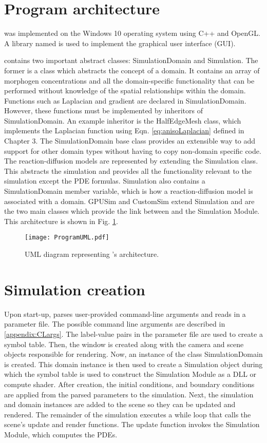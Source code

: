 \section{Program architecture} 
\ProgramName{} was implemented on the Windows 10 operating system using C++ and OpenGL. A library named  \citep{cornut2019} is used to implement the graphical user interface (GUI). 

\ProgramName{} contains two important abstract classes: SimulationDomain and Simulation. The former is a class which abstracts the concept of a domain. It contains an array of morphogen concentrations and all the domain-specific functionality that can be performed without knowledge of the spatial relationships within the domain. Functions such as Laplacian and gradient are declared in SimulationDomain. However, these functions must be implemented by inheritors of SimulationDomain. An example inheritor is the HalfEdgeMesh class, which implements the Laplacian function using Eqn. \ref{eq:anisoLaplacian} defined in Chapter 3. The SimulationDomain base class provides an extensible way to add support for other domain types without having to copy non-domain specific code. The reaction-diffusion models are represented by extending the Simulation class. This abstracts the simulation and provides all the functionality relevant to the simulation except the PDE formulas. Simulation also contains a SimulationDomain member variable, which is how a reaction-diffusion model is associated with a domain. GPUSim and CustomSim extend Simulation and are the two main classes which provide the link between \ProgramName{} and the Simulation Module. This architecture is shown in Fig. \ref{fig:umlDiagram}.

\begin{figure}[H]
	\centering
	\texttt{[image: ProgramUML.pdf]}
	\caption{UML diagram representing \ProgramName{}'s architecture.}
	\label{fig:umlDiagram}
\end{figure}

\section{Simulation creation}
Upon start-up, \ProgramName{} parses user-provided command-line arguments and reads in a parameter file. The possible command line arguments are described in \ref{appendix:CLargs}. The label-value pairs in the parameter file are used to create a symbol table. Then, the window is created along with the camera and scene objects responsible for rendering. Now, an instance of the class SimulationDomain is created. This domain instance is then used to create a Simulation object during which the symbol table is used to construct the Simulation Module as a DLL or compute shader. After creation, the initial conditions, and boundary conditions are applied from the parsed parameters to the simulation. Next, the simulation and domain instances are added to the scene so they can be updated and rendered. The remainder of the simulation executes a while loop that calls the scene's update and render functions. The update function invokes the Simulation Module, which computes the PDEs.

